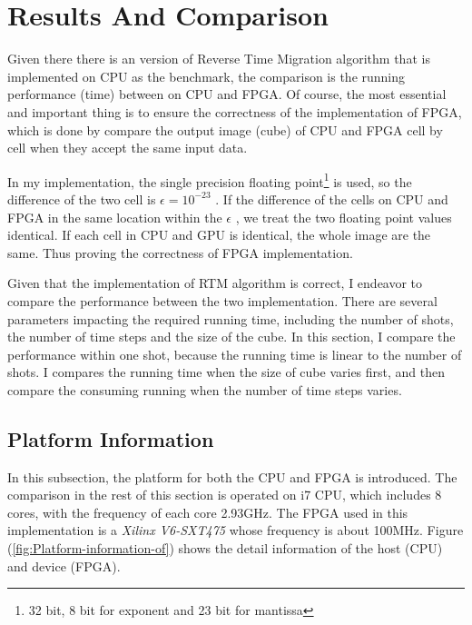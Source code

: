 \section{Results And Comparison} %

Given there there is an version of Reverse Time Migration algorithm
that is implemented on CPU as the benchmark, the comparison is the
running performance (time) between on CPU and FPGA. Of course, the
most essential and important thing is to ensure the correctness of
the implementation of FPGA, which is done by compare the output image
(cube) of CPU and FPGA cell by cell when they accept the same input
data.

In my implementation, the single precision floating point\footnote{32
bit, 8 bit for exponent and 23 bit for mantissa} is used, so the difference
of the two cell is \( \epsilon=10^{-23} \)
. If the difference of the cells on CPU and FPGA in the same location
within the \( \epsilon \)
, we treat the two floating point values identical. If each cell in
CPU and GPU is identical, the whole image are the same. Thus proving
the correctness of FPGA implementation.

Given that the implementation of RTM algorithm is correct, I endeavor
to compare the performance between the two implementation. There are
several parameters impacting the required running time, including
the number of shots, the number of time steps and the size of the
cube. In this section, I compare the performance within one shot,
because the running time is linear to the number of shots. I compares
the running time when the size of cube varies first, and then compare
the consuming running when the number of time steps varies.

\subsection{Platform Information} %

In this subsection, the platform for both the CPU and FPGA is introduced.
The comparison in the rest of this section is operated on i7 CPU,
which includes 8 cores, with the frequency of each core 2.93GHz. The
FPGA used in this implementation is a \emph{Xilinx V6-SXT475} whose
frequency is about 100MHz. Figure (\ref{fig:Platform-information-of})
shows the detail information of the host (CPU) and device (FPGA).

